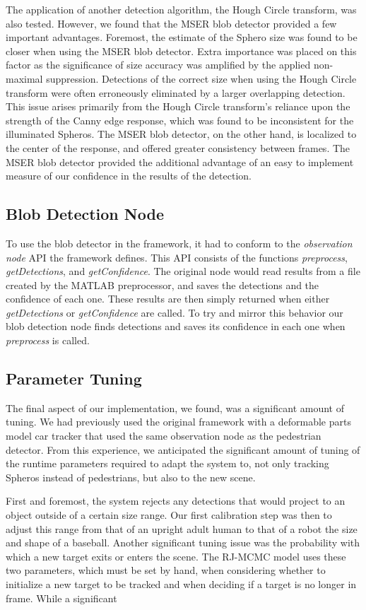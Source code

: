 The application of another detection algorithm, the Hough Circle transform, was also tested. However, we found that the MSER
blob detector provided a few important advantages. Foremost, the estimate of the Sphero size was found to be closer when
using the MSER blob detector. Extra importance was placed on this factor as the significance of size accuracy was amplified by
the applied non-maximal suppression. Detections of the correct size when using the Hough Circle transform were often
erroneously eliminated by a larger overlapping detection. This issue arises primarily from the Hough Circle transform's reliance
upon the strength of the Canny edge response, which was found to be inconsistent for the illuminated Spheros. The MSER blob
detector, on the other hand, is localized to the center of the response, and offered greater consistency between frames. The
MSER blob detector provided the additional advantage of an easy to implement measure of our confidence in the results of the
detection.

\subsection{Blob Detection Node}
To use the blob detector in the framework, it had to conform to the \emph{observation node} API the framework defines. This API
consists of the functions \emph{preprocess}, \emph{getDetections}, and \emph{getConfidence}. The original node would read
results from a file created by the MATLAB preprocessor, and saves the detections and the confidence of each one.  These results
are then simply returned when either \emph{getDetections} or \emph{getConfidence} are called. To try and mirror this behavior
our blob detection node finds detections and saves its confidence in each one when \emph{preprocess} is called.

\subsection{Parameter Tuning}
The final aspect of our implementation, we found, was a significant amount of tuning. We had previously used the original
framework with a deformable parts model car tracker that used the same observation node as the pedestrian detector. From this
experience, we anticipated the significant amount of tuning of the runtime parameters required to adapt the system to, not only
tracking Spheros instead of pedestrians, but also to the new scene.

First and foremost, the system rejects any detections that would project to an object outside of a certain size range. Our first
calibration step was then to adjust this range from that of an upright adult human to that of a robot the size and shape of a
baseball. Another significant tuning issue was the probability with which a new target exits or enters the scene. The RJ-MCMC
model uses these two parameters, which must be set by hand, when considering whether to initialize a new target to be tracked
and when deciding if a target is no longer in frame. While a significant